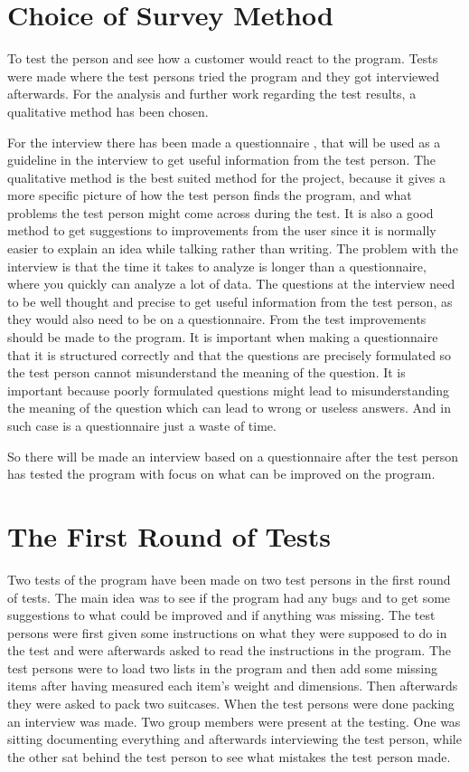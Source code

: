 \section{Choice of Survey Method}
\label{sec:test}
To test the person and see how a customer would react to the program. Tests were made where the test persons tried the program and they got interviewed afterwards. For the analysis and further work regarding the test results, a qualitative method has been chosen.

For the interview there has been made a questionnaire , that will be used as a guideline in the interview to get useful information from the test person. The qualitative method is the best suited method for the project, because it gives a more specific picture of how the test person finds the program, and what problems the test person might come across during the test. It is also a good method to get suggestions to improvements from the user since it is normally easier to explain an idea while talking rather than writing. The problem with the interview is that the time it takes to analyze is longer than a questionnaire, where you quickly can analyze a lot of data. The questions at the interview need to be well thought and precise to get useful information from the test person, as they would also need to be on a questionnaire. From the test improvements should be made to the program. 
It is important when making a questionnaire that it is structured correctly and that the questions are precisely formulated so the test person cannot misunderstand the meaning of the question. It is important because poorly formulated questions might lead to misunderstanding the meaning of the question which can lead to wrong or useless answers. And in such case is a questionnaire just a waste of time.

So there will be made an interview based on a questionnaire after the test person has tested the program with focus on what can be improved on the program.

\section{The First Round of Tests}
Two tests of the program have been made on two test persons in the first round of tests. The main idea was to see if the program had any bugs and to get some suggestions to what could be improved and if anything was missing. The test persons were first given some instructions on what they were supposed to do in the test and were afterwards asked to read the instructions in the program. The test persons were to load two lists in the program and then add some missing items after having measured each item's weight and dimensions. Then afterwards they were asked to pack two suitcases. When the test persons were done packing an interview was made. Two group members were present at the testing. One was sitting documenting everything and afterwards interviewing the test person, while the other sat behind the test person to see what mistakes the test person made.


